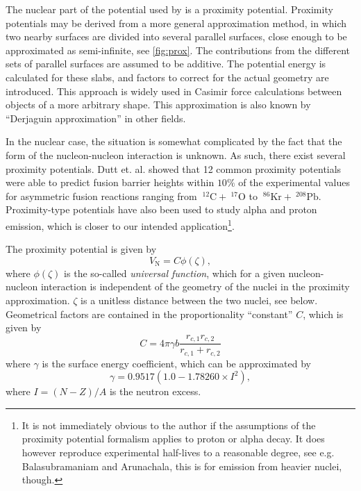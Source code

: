The nuclear part of the potential used by  is a proximity potential\cite{gollerthan:1988:thesis,blocki1977}. 
Proximity potentials may be derived from a more general approximation method, in which two nearby surfaces are divided into several parallel surfaces, close enough to be approximated as semi-infinite, see \autoref{fig:prox}\cite{fosco:2012}. The contributions from the different sets of parallel surfaces are assumed to be additive.
The potential energy is calculated for these slabs, and factors to correct for the actual geometry are introduced. This approach is widely used in Casimir force calculations between objects of a more arbitrary shape\cite{fosco:2011}. This approximation is also known by ``Derjaguin approximation'' in other fields\cite{fosco:2012}.

In the nuclear case, the situation is somewhat complicated by the fact that the form of the nucleon-nucleon interaction is unknown. As such, there exist several proximity potentials\cite{dutt:2010}. Dutt et. al. showed that 12 common proximity potentials were able to predict fusion barrier heights within $10\%$ of the experimental values for asymmetric fusion reactions ranging from $~^{12}\mathrm{C} + ~^{17}\mathrm{O}$ to $~^{86}\mathrm{Kr} + ~^{208}\mathrm{Pb}$\cite{dutt:2010}. Proximity-type potentials have also been used to study alpha and proton emission\cite{proton-alpha-proxy:2005,proton-proxy:2010}, which is closer to our intended application\footnote{It is not immediately obvious to the author if the assumptions of the proximity potential formalism applies to proton or alpha decay. It does however reproduce experimental half-lives to a reasonable degree, see e.g. Balasubramaniam and Arunachala\cite{proton-alpha-proxy:2005}, this is for emission from heavier nuclei, though.}.

The proximity potential is given by
\begin{equation}
V_\text{N} = C \phi(\zeta),\label{eq:vn}
\end{equation}
where $\phi(\zeta)$ is the so-called \emph{universal function}, which for a given nucleon-nucleon interaction is independent of the geometry of the nuclei in the proximity approximation. $\zeta$ is a unitless distance between the two nuclei, see below. Geometrical factors are contained in the proportionality ``constant'' $C$, which is given by
\begin{equation}
C = 4\pi \gamma b \frac{r_{c,1} r_{c,2}}{r_{c,1} + r_{c,2}}
\end{equation}
where $\gamma$ is the surface energy coefficient, which can be approximated by
\begin{equation}
\gamma= 0.9517 (1.0 - 1.78260 \times I^2),
\end{equation}
where $I=(N-Z)/A$ is the neutron excess.

